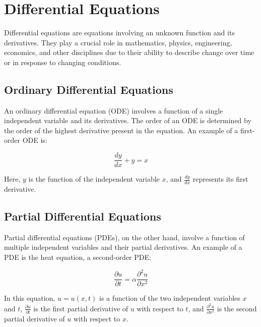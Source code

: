 \chapter{Differential Equations}

Differential equations are equations involving an unknown function and its derivatives. They play a crucial role in mathematics, physics, engineering, economics, and other disciplines due to their ability to describe change over time or in response to changing conditions.

\section{Ordinary Differential Equations}

An ordinary differential equation (ODE) involves a function of a single independent variable and its derivatives. The order of an ODE is determined by the order of the highest derivative present in the equation. An example of a first-order ODE is:

\begin{equation}
\frac{dy}{dx} + y = x
\end{equation}

Here, $y$ is the function of the independent variable $x$, and $\frac{dy}{dx}$ represents its first derivative.

\section{Partial Differential Equations}

Partial differential equations (PDEs), on the other hand, involve a function of multiple independent variables and their partial derivatives. An example of a PDE is the heat equation, a second-order PDE:

\begin{equation}
\frac{\partial u}{\partial t} = \alpha \frac{\partial^2 u}{\partial x^2}
\end{equation}

In this equation, $u = u(x, t)$ is a function of the two independent variables $x$ and $t$, $\frac{\partial u}{\partial t}$ is the first partial derivative of $u$ with respect to $t$, and $\frac{\partial^2 u}{\partial x^2}$ is the second partial derivative of $u$ with respect to $x$.


